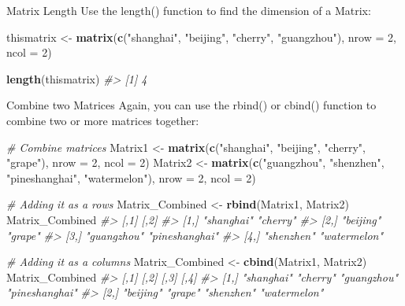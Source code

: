 \documentclass[
]{book}
\newenvironment{Shaded}{\begin{snugshade}}{\end{snugshade}}
\newcommand{\AttributeTok}[1]{\textcolor[rgb]{0.13,0.29,0.53}{#1}}
\newcommand{\CommentTok}[1]{\textcolor[rgb]{0.56,0.35,0.01}{\textit{#1}}}
\newcommand{\DecValTok}[1]{\textcolor[rgb]{0.00,0.00,0.81}{#1}}
\newcommand{\FunctionTok}[1]{\textcolor[rgb]{0.13,0.29,0.53}{\textbf{#1}}}
\newcommand{\NormalTok}[1]{#1}
\newcommand{\OtherTok}[1]{\textcolor[rgb]{0.56,0.35,0.01}{#1}}
\newcommand{\StringTok}[1]{\textcolor[rgb]{0.31,0.60,0.02}{#1}}
\begin{document}
Matrix Length
Use the length() function to find the dimension of a Matrix:

\begin{Shaded}
\begin{Highlighting}[]
\NormalTok{thismatrix }\OtherTok{\textless{}{-}} \FunctionTok{matrix}\NormalTok{(}\FunctionTok{c}\NormalTok{(}\StringTok{"shanghai"}\NormalTok{, }\StringTok{"beijing"}\NormalTok{, }\StringTok{"cherry"}\NormalTok{, }\StringTok{"guangzhou"}\NormalTok{), }\AttributeTok{nrow =} \DecValTok{2}\NormalTok{, }\AttributeTok{ncol =} \DecValTok{2}\NormalTok{)}

\FunctionTok{length}\NormalTok{(thismatrix)}
\CommentTok{\#\textgreater{} [1] 4}
\end{Highlighting}
\end{Shaded}

Combine two Matrices
Again, you can use the rbind() or cbind() function to combine two or more matrices together:

\begin{Shaded}
\begin{Highlighting}[]
\CommentTok{\# Combine matrices}
\NormalTok{Matrix1 }\OtherTok{\textless{}{-}} \FunctionTok{matrix}\NormalTok{(}\FunctionTok{c}\NormalTok{(}\StringTok{"shanghai"}\NormalTok{, }\StringTok{"beijing"}\NormalTok{, }\StringTok{"cherry"}\NormalTok{, }\StringTok{"grape"}\NormalTok{), }\AttributeTok{nrow =} \DecValTok{2}\NormalTok{, }\AttributeTok{ncol =} \DecValTok{2}\NormalTok{)}
\NormalTok{Matrix2 }\OtherTok{\textless{}{-}} \FunctionTok{matrix}\NormalTok{(}\FunctionTok{c}\NormalTok{(}\StringTok{"guangzhou"}\NormalTok{, }\StringTok{"shenzhen"}\NormalTok{, }\StringTok{"pineshanghai"}\NormalTok{, }\StringTok{"watermelon"}\NormalTok{), }\AttributeTok{nrow =} \DecValTok{2}\NormalTok{, }\AttributeTok{ncol =} \DecValTok{2}\NormalTok{)}

\CommentTok{\# Adding it as a rows}
\NormalTok{Matrix\_Combined }\OtherTok{\textless{}{-}} \FunctionTok{rbind}\NormalTok{(Matrix1, Matrix2)}
\NormalTok{Matrix\_Combined}
\CommentTok{\#\textgreater{}      [,1]        [,2]          }
\CommentTok{\#\textgreater{} [1,] "shanghai"  "cherry"      }
\CommentTok{\#\textgreater{} [2,] "beijing"   "grape"       }
\CommentTok{\#\textgreater{} [3,] "guangzhou" "pineshanghai"}
\CommentTok{\#\textgreater{} [4,] "shenzhen"  "watermelon"}

\CommentTok{\# Adding it as a columns}
\NormalTok{Matrix\_Combined }\OtherTok{\textless{}{-}} \FunctionTok{cbind}\NormalTok{(Matrix1, Matrix2)}
\NormalTok{Matrix\_Combined}
\CommentTok{\#\textgreater{}      [,1]       [,2]     [,3]        [,4]          }
\CommentTok{\#\textgreater{} [1,] "shanghai" "cherry" "guangzhou" "pineshanghai"}
\CommentTok{\#\textgreater{} [2,] "beijing"  "grape"  "shenzhen"  "watermelon"}
\end{Highlighting}
\end{Shaded}
\end{document}
